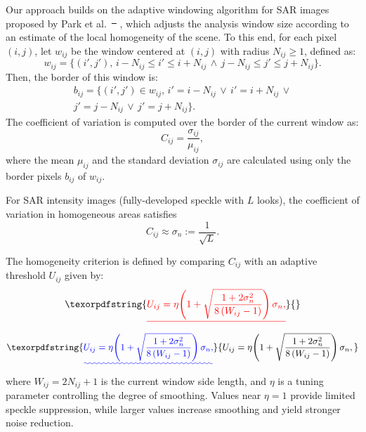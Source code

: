 \documentclass[
  lettersize  journal,
]{IEEEtran}%
\providecommand{\DIFaddtex}[1]{{\protect\color{blue}\uwave{#1}}} %
\providecommand{\DIFdeltex}[1]{{\protect\color{red}\sout{#1}}} %
\providecommand{\DIFaddbegin}{} %
\providecommand{\DIFaddend}{} %
\providecommand{\DIFdelbegin}{} %
\providecommand{\DIFdelend}{} %
\providecommand{\DIFadd}[1]{\texorpdfstring{\DIFaddtex{#1}}{#1}} %
\providecommand{\DIFdel}[1]{\texorpdfstring{\DIFdeltex{#1}}{}} %
\providecommand{\DIFscaledelfig}{0.5}
\newlength{\DIFdelgraphicswidth} %
\newlength{\DIFdelgraphicsheight} %
\providecommand{\DIFaddincludegraphics}[2][]{{\color{blue}\fbox{\DIFOincludegraphics[#1]{#2}}}} %
\providecommand{\DIFdelincludegraphics}[2][]{%
\sbox{\DIFdelgraphicsbox}{\DIFOincludegraphics[#1]{#2}}%
\settoboxwidth{\DIFdelgraphicswidth}{\DIFdelgraphicsbox} %
\settoboxtotalheight{\DIFdelgraphicsheight}{\DIFdelgraphicsbox} %
\scalebox{\DIFscaledelfig}{%
\parbox[b]{\DIFdelgraphicswidth}{\usebox{\DIFdelgraphicsbox}\\[-\baselineskip] \rule{\DIFdelgraphicswidth}{0em}}\llap{\resizebox{\DIFdelgraphicswidth}{\DIFdelgraphicsheight}{%
\setlength{\unitlength}{\DIFdelgraphicswidth}%
\begin{picture}(1,1)%
\thicklines\linethickness{2pt} %
{\color[rgb]{1,0,0}\put(0,0){\framebox(1,1){}}}%
{\color[rgb]{1,0,0}\put(0,0){\line( 1,1){1}}}%
{\color[rgb]{1,0,0}\put(0,1){\line(1,-1){1}}}%
\end{picture}%
}\hspace*{3pt}}} %
} %
\DeclareRobustCommand{\DIFaddbegin}{\DIFOaddbegin \let\includegraphics\DIFaddincludegraphics} %
\DeclareRobustCommand{\DIFaddend}{\DIFOaddend \let\includegraphics\DIFOincludegraphics} %
\DeclareRobustCommand{\DIFdelbegin}{\DIFOdelbegin \let\includegraphics\DIFdelincludegraphics} %
\DeclareRobustCommand{\DIFdelend}{\DIFOaddend \let\includegraphics\DIFOincludegraphics} %
\begin{document}
Our approach builds on the adaptive windowing algorithm for SAR images
proposed by Park et al.~\DIFdelbegin \DIFdel{\mbox{%
}\hskip0pt%
}\DIFdelend \DIFaddbegin \DIFadd{\mbox{%
}\hskip0pt%
}\DIFaddend , which adjusts
the analysis window size according to an estimate of the local
homogeneity of the scene. To this end, for each pixel \((i,j)\), let
\(w_{ij}\) be the window centered at \((i,j)\) with radius
\(N_{ij} \ge 1\), defined as: \begin{equation*}
w_{ij} = \{(i',j'),\, i-N_{ij} \le i' \le i+N_{ij} \,\wedge\, j-N_{ij} \le j' \le j+N_{ij}\}.
\end{equation*} Then, the border of this window is: \begin{multline*}
b_{ij} = \{(i',j') \in w_{ij},\, i' = i-N_{ij} \,\vee\, i' = i+N_{ij} \,\vee\\
j' = j-N_{ij} \,\vee\, j' = j+N_{ij}\}.
\end{multline*} The coefficient of variation is computed over the border
of the current window as: \begin{equation*}
C_{ij} = \frac{\sigma_{ij}}{\mu_{ij}},
\end{equation*} where the mean \(\mu_{ij}\) and the standard deviation
\(\sigma_{ij}\) are calculated using only the border pixels \(b_{ij}\)
of \(w_{ij}\).

For SAR intensity images (fully-developed speckle with \(L\) looks), the
coefficient of variation in homogeneous areas satisfies
\begin{equation*}
C_{ij} \approx \sigma_n := \frac{1}{\sqrt{L}}.
\end{equation*}

The homogeneity criterion is defined by comparing \(C_{ij}\) with an
adaptive threshold \(U_{ij}\) given by: \DIFdelbegin \begin{displaymath}
\DIFdel{U_{ij} = \eta\!\left( 1 + \sqrt{\frac{1 + 2\sigma_n^2}{8\,(W_{ij} - 1)}} \right)\sigma_n,
}\end{displaymath}%
\DIFdelend \DIFaddbegin \begin{equation*}
\DIFadd{U_{ij} = \eta\!\left( 1 + \sqrt{\frac{1 + 2\sigma_n^2}{8\,(W_{ij} - 1)}} \right)\sigma_n,
}\end{equation*}\DIFaddend  where \(W_{ij} = 2N_{ij} + 1\) is the current window
side length, and \(\eta\) is a tuning parameter controlling the degree
of smoothing. Values near \(\eta=1\) provide limited speckle
suppression, while larger values increase smoothing and yield stronger
noise reduction.
\end{document}
